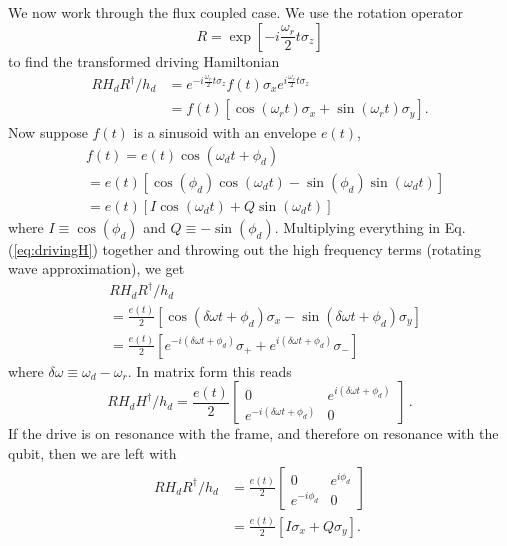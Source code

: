 We now work through the flux coupled case.
We use the rotation operator \begin{equation}
R = \exp \left[ -i \frac{\omega_r}{2} t \sigma_z \right] \end{equation}
to find the transformed driving Hamiltonian \begin{align}
RH_d R^{\dagger}/h_d
&= e^{-i \frac{\omega_r}{2} t \sigma_z} f(t)\sigma_x e^{i \frac{\omega_r}{2} t \sigma_z} \nonumber \\
&= f(t)\left[ \cos\left(\omega_r t\right)\sigma_x + \sin\left(\omega_r t\right)\sigma_y \right]. \label{eq:drivingH}
\end{align}
Now suppose $f(t)$ is a sinusoid with an envelope $e(t)$,
\begin{align}
& f(t)
= e(t)\cos \left( \omega_d t + \phi_d \right) \\
&= e(t) \left[ \cos \left( \phi_d \right) \cos \left( \omega_d t \right) - \sin \left( \phi_d \right) \sin \left( \omega_d t \right) \right] \\
&= e(t) \left[ I \cos\left(\omega_d t\right) + Q \sin \left(\omega_d t\right) \right] \label{eq:drivingFunctionIQ}
\end{align}
where $I \equiv \cos(\phi_d)$ and $Q \equiv - \sin(\phi_d)$.
Multiplying everything in Eq. (\ref{eq:drivingH}) together and throwing out the high frequency terms (rotating wave approximation), we get
\begin{align}
& RH_dR^{\dagger}/h_d \\
&= \frac{e(t)}{2} \left[ \cos(\delta\omega t + \phi_d)\sigma_x - \sin(\delta\omega t + \phi_d)\sigma_y \right] \\
&= \frac{e(t)}{2} \left[ e^{-i(\delta \omega t + \phi_d)} \sigma_+ + e^{i(\delta \omega t + \phi_d)} \sigma_- \right]
\end{align}
where $\delta\omega \equiv \omega_d - \omega_r$. In matrix form this reads
\begin{equation}
  RH_dH^{\dagger}/h_d =
  \frac{e(t)}{2}
  \left[ \begin{array}{cc}
    0 & e^{i(\delta\omega t + \phi_d)} \\
    e^{-i(\delta\omega t + \phi_d)} & 0
  \end{array} \right]
  \, . \label{eq:drivingH_matrixForm}
\end{equation}
If the drive is on resonance with the frame, and therefore on resonance with the qubit, then we are left with
\begin{align}
  RH_dR^{\dagger}/h_d
  &= \frac{e(t)}{2}
  \left[ \begin{array}{cc}
    0 & e^{i\phi_d} \\ e^{-i\phi_d} & 0
  \end{array} \right] \\
  &= \frac{e(t)}{2} \left[ I \sigma_x + Q \sigma_y \right] .
\end{align}
